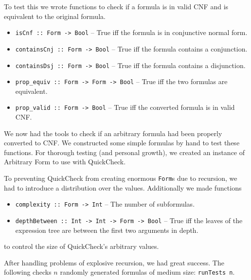 \documentclass[11pt,a4paper]{article}
\numberwithin{equation}{section}%
\begin{document}
To test this we wrote functions to check if a formula is in valid CNF and is equivalent to the original formula.
\begin{itemize}
    \item \texttt{isCnf :: Form -> Bool} \--- True iff the formula is in conjunctive normal form.
    \item \texttt{containsCnj :: Form -> Bool} \--- True iff the formula contains a conjunction.
    \item \texttt{containsDsj :: Form -> Bool} \--- True iff the formula contains a disjunction.
    \item \texttt{prop\_equiv :: Form -> Form -> Bool} \--- True iff the two formulas are equivalent.
    \item \texttt{prop\_valid :: Form -> Bool} \--- True iff the converted formula is in valid CNF.
\end{itemize}

We now had the tools to check if an arbitrary formula had been properly converted to CNF. We constructed some simple formulas by hand to test these functions. For thorough testing (and personal growth), we created an instance of Arbitrary Form to use with QuickCheck. 

To preventing QuickCheck from creating enormous \texttt{Form}s due to recursion, we had to introduce a distribution over the values. Additionally we made functions
\begin{itemize}
    \item \texttt{complexity :: Form -> Int} \--- The number of subformulas.
    \item \texttt{depthBetween :: Int -> Int -> Form -> Bool} \--- True iff the leaves of the expression tree are between the first two arguments in depth.
\end{itemize}
to control the size of QuickCheck's arbitrary values.

After handling problems of explosive recursion, we had great success. The following checks $n$ randomly generated formulas of medium size: \texttt{runTests n}.
\end{document}
